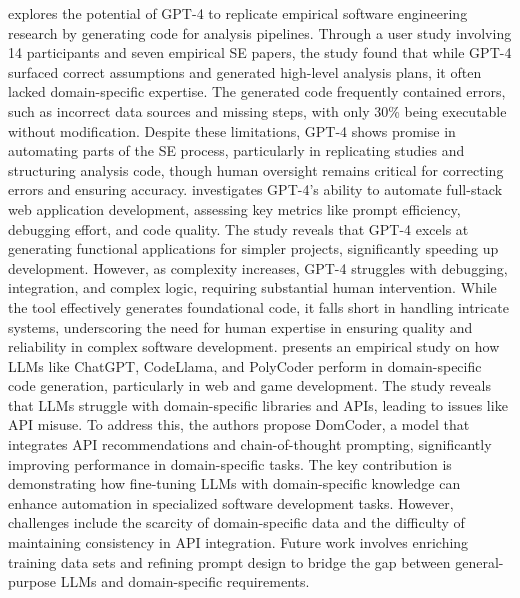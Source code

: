 \citet{liang2024can} explores the potential of GPT-4 to replicate empirical software engineering research by generating code for analysis pipelines. Through a user study involving 14 participants and seven empirical SE papers, the study found that while GPT-4 surfaced correct assumptions and generated high-level analysis plans, it often lacked domain-specific expertise. The generated code frequently contained errors, such as incorrect data sources and missing steps, with only 30\% being executable without modification. Despite these limitations, GPT-4 shows promise in automating parts of the SE process, particularly in replicating studies and structuring analysis code, though human oversight remains critical for correcting errors and ensuring accuracy. \citet{sandberg2024evaluating} investigates GPT-4’s ability to automate full-stack web application development, assessing key metrics like prompt efficiency, debugging effort, and code quality. The study reveals that GPT-4 excels at generating functional applications for simpler projects, significantly speeding up development. However, as complexity increases, GPT-4 struggles with debugging, integration, and complex logic, requiring substantial human intervention. While the tool effectively generates foundational code, it falls short in handling intricate systems, underscoring the need for human expertise in ensuring quality and reliability in complex software development.
\citet{gu2023effectiveness} presents an empirical study on how LLMs like ChatGPT, CodeLlama, and PolyCoder perform in domain-specific code generation, particularly in web and game development. The study reveals that LLMs struggle with domain-specific libraries and APIs, leading to issues like API misuse. To address this, the authors propose DomCoder, a model that integrates API recommendations and chain-of-thought prompting, significantly improving performance in domain-specific tasks. The key contribution is demonstrating how fine-tuning LLMs with domain-specific knowledge can enhance automation in specialized software development tasks. However, challenges include the scarcity of domain-specific data and the difficulty of maintaining consistency in API integration. Future work involves enriching training data sets and refining prompt design to bridge the gap between general-purpose LLMs and domain-specific requirements.
